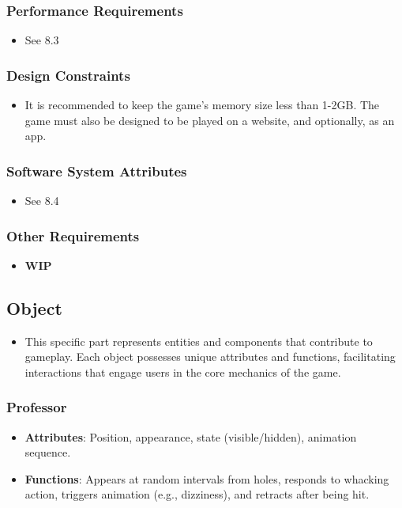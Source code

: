 \documentclass{article}
\begin{document}
\subsubsection{Performance Requirements}
\begin{itemize}
    \item See 8.3
\end{itemize}
\subsubsection{Design Constraints}
\begin{itemize}
    \item It is recommended to keep the game’s memory size less than 1-2GB. The game must also be designed to be played on a website, and optionally, as an app.
\end{itemize}
\subsubsection{Software System Attributes}
\begin{itemize}
    \item See 8.4
\end{itemize}
\subsubsection{Other Requirements}
\begin{itemize}
    \item \textbf{WIP}
\end{itemize}

\subsection{Object}
\begin{itemize}
    \item This specific part represents entities and components that contribute to gameplay. Each object possesses unique attributes and functions, facilitating interactions that engage users in the core mechanics of the game.
\end{itemize}
\subsubsection{Professor}
\begin{itemize}
    \item \textbf{Attributes}: Position, appearance, state (visible/hidden), animation sequence.
    \item \textbf{Functions}: Appears at random intervals from holes, responds to whacking action, triggers animation (e.g., dizziness), and retracts after being hit.
\end{itemize}
\end{document}
